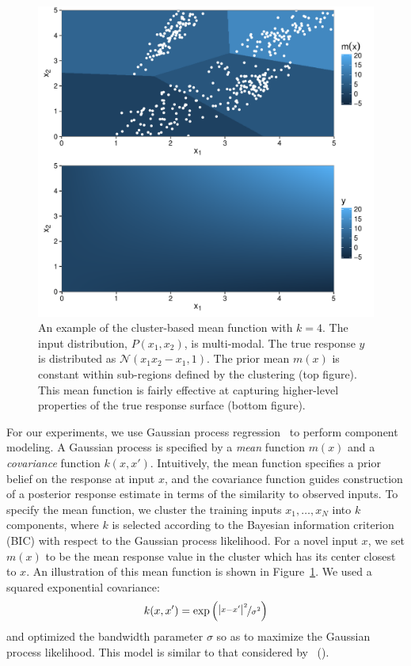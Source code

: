 \documentclass[letterpaper]{article}
\begin{document}
\begin{figure}
	\centering
	\includegraphics[width=\linewidth]{figures/mean-function-example.pdf}
	\caption{An example of the cluster-based mean function with $k=4$. The input distribution, $P(x_1, x_2)$, is multi-modal. The true response $y$ is distributed as $\mathcal{N}(x_1 x_2 - x_1, 1)$.
	The prior mean $m(x)$ is constant within sub-regions defined by the clustering (top figure). This mean function is fairly effective at capturing higher-level properties of the true response surface (bottom figure).}
	\label{fig:mean-function-example}
\end{figure}

For our experiments, we use Gaussian process regression~\cite{rasmussen2004gaussian} to perform component modeling.
A Gaussian process is specified by a \emph{mean} function $m(x)$ and a \emph{covariance} function $k(x, x')$.
Intuitively, the mean function specifies a prior belief on the response at input $x$, and the covariance function guides construction of a posterior response estimate in terms of the similarity to observed inputs.
To specify the mean function, we cluster the training inputs $x_1, \ldots, x_N$ into $k$ components, where $k$ is selected according to the Bayesian information criterion (BIC) with respect to the Gaussian process likelihood.
For a novel input $x$, we set $m(x)$ to be the mean response value in the cluster which has its center closest to $x$. An illustration of this mean function is shown in Figure~\ref{fig:mean-function-example}.
We used a squared exponential covariance:
\begin{align}
k(x, x') = \exp{\left( \nicefrac{\left| x - x' \right|^2}{\sigma^2} \right)}
\end{align}
and optimized the bandwidth parameter $\sigma$ so as to maximize the Gaussian process likelihood.
This model is similar to that considered by \citeauthor{sacks1989design}~(\citeyear{sacks1989design}).
\end{document}
